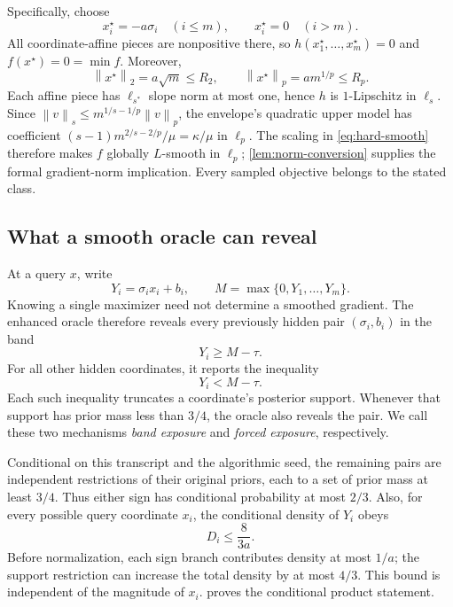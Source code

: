\documentclass[11pt]{article}
\newcommand{\norm}[2]{\left\lVert #1\right\rVert_{#2}}
\theoremstyle{definition}
\theoremstyle{remark}
\begin{document}
Specifically, choose
\begin{equation}
\label{eq:hard-minimizer}
 x_i^\star=-a\sigma_i\quad(i\le m),\qquad
 x_i^\star=0\quad(i>m).
\end{equation}
All coordinate-affine pieces are nonpositive there, so
$h(x_1^\star,\ldots,x_m^\star)=0$ and
$f(x^\star)=0=\min f$. Moreover,
\begin{equation}
\label{eq:hard-radii}
 \norm{x^\star}{2}=a\sqrt m\le R_2,\qquad
 \norm{x^\star}{p}=am^{1/p}\le R_p.
\end{equation}
Each affine piece has $\ell_{s^*}$ slope norm at most one, hence $h$ is
$1$-Lipschitz in $\ell_s$. Since
$\norm{v}{s}\le m^{1/s-1/p}\norm{v}{p}$, the envelope's quadratic upper
model has coefficient
$(s-1)m^{2/s-2/p}/\mu=\kappa/\mu$ in $\ell_p$.
The scaling in \cref{eq:hard-smooth} therefore makes $f$ globally
$L$-smooth in $\ell_p$; \cref{lem:norm-conversion} supplies the formal
gradient-norm implication. Every sampled objective belongs to the
stated class.

\subsection{What a smooth oracle can reveal}

At a query $x$, write
\begin{equation}
\label{eq:Y-and-M}
 Y_i=\sigma_i x_i+b_i,\qquad
 M=\max\{0,Y_1,\ldots,Y_m\}.
\end{equation}
Knowing a single maximizer need not determine a smoothed gradient.
The enhanced oracle therefore reveals every previously hidden pair
$(\sigma_i,b_i)$ in the band
\begin{equation}
\label{eq:near-band}
 Y_i\ge M-\tau.
\end{equation}
For all other hidden coordinates, it reports the inequality
\begin{equation}
\label{eq:posterior-truncation}
 Y_i<M-\tau.
\end{equation}
Each such inequality truncates a coordinate's posterior support.
Whenever that support has prior mass less than $3/4$, the oracle also
reveals the pair. We call these two mechanisms \emph{band exposure}
and \emph{forced exposure}, respectively.

Conditional on this transcript and the algorithmic seed, the remaining
pairs are independent restrictions of their original priors, each to
a set of prior mass at least $3/4$. Thus either sign has conditional
probability at most $2/3$. Also, for every possible query coordinate
$x_i$, the conditional density of $Y_i$ obeys
\begin{equation}
\label{eq:density-bound-main}
 D_i\le\frac{8}{3a}.
\end{equation}
Before normalization, each sign branch contributes density at most
$1/a$; the support restriction can increase the total density by at
most $4/3$. This bound is independent of the magnitude of $x_i$.
 proves the conditional product statement.
\end{document}
